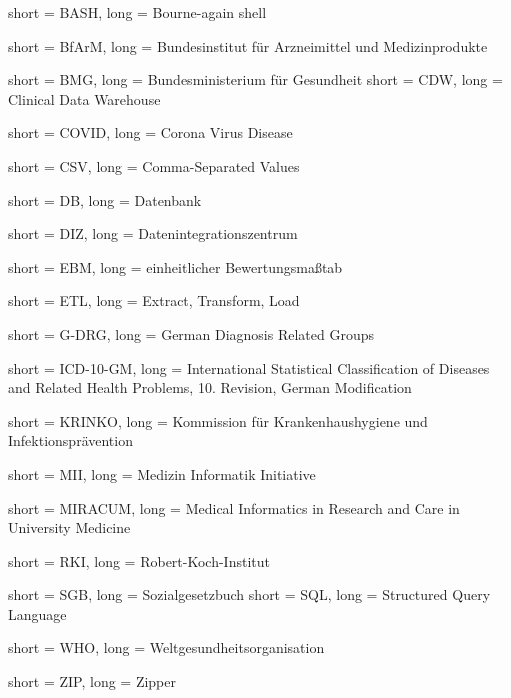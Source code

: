 
	{
		short = BASH,
		long = Bourne-again shell
	}
	
	{
		short = BfArM,
		long = Bundesinstitut für Arzneimittel und Medizinprodukte
	}

	{
		short = BMG,
		long = Bundesministerium für Gesundheit
	}
	{	short = CDW,
		long = Clinical Data Warehouse
	}

	{	short = COVID,
		long = Corona Virus Disease
	}

	{	short = CSV,
		long = Comma-Separated Values
	}
	
	{	short = DB,
		long = Datenbank
	}
	
	{	short = DIZ,
		long = Datenintegrationszentrum
	}
	
	{	short = EBM,
		long = einheitlicher Bewertungsmaßtab %
	}
	
	{	short = ETL,
		long = {Extract, Transform, Load}
	}
	
	{	short = G-DRG,
		long = German Diagnosis Related Groups
	}
	
	{	short = ICD-10-GM,
		long = {International Statistical Classification of Diseases and Related Health Problems, 10. Revision, German Modification}
	}
	
	{	short = KRINKO,
		long = Kommission für Krankenhaushygiene und Infektionsprävention
	}

	{	short = MII,
		long = Medizin Informatik Initiative
	}

	{	short = MIRACUM,
		long = Medical Informatics in Research and Care in University Medicine
	}

		
	{	short = RKI,
		long = Robert-Koch-Institut
	}

	{	short = SGB,
		long = Sozialgesetzbuch
	}
	{	short = SQL,
		long = Structured Query Language
	}

	{	short = WHO,
		long = Weltgesundheitsorganisation
	}

	{	short = ZIP,
		long = Zipper
	}

